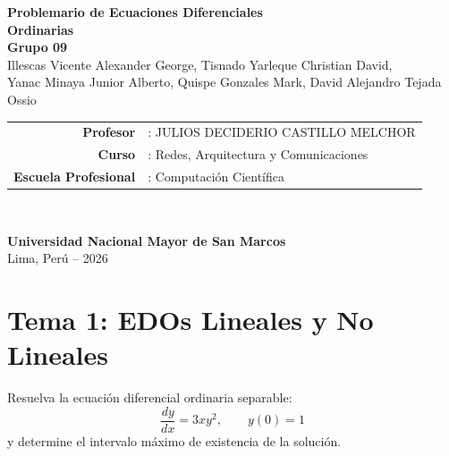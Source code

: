 \documentclass[11pt,a4paper]{article}
\begin{document}
\begin{titlepage}
\begin{center}
    \vspace*{2.0cm}
    
    {\fontsize{26}{32}\selectfont \textbf{Problemario de Ecuaciones Diferenciales}}\\[3mm]
    {\fontsize{26}{32}\selectfont \textbf{Ordinarias}}\\[8mm]
    {\LARGE \textbf{Grupo 09}}\\[2.0cm]
    
    {\normalsize Illescas Vicente Alexander George, \quad Tisnado Yarleque Christian David,}\\[2.5mm]
    {\normalsize Yanac Minaya Junior Alberto, \quad Quispe Gonzales Mark, \quad David Alejandro Tejada Ossio}\\[2.2cm]
    
    \renewcommand{\arraystretch}{1.35}
    \begin{tabular}{rl}
        \textbf{Profesor} & : JULIOS DECIDERIO CASTILLO MELCHOR \\
        \textbf{Curso} & : Redes, Arquitectura y Comunicaciones \\
        \textbf{Escuela Profesional} & : Computación Científica
    \end{tabular}\\[2.5cm]
    
    \vfill
    
    {\large \textbf{Universidad Nacional Mayor de San Marcos}}\\[2mm]
    {\normalsize Lima, Perú -- 2026}
    
    \vspace*{1.0cm}
\end{center}
\end{titlepage}

\section*{\color{unmsmblue} Tema 1: EDOs Lineales y No Lineales}

\begin{problema}[Problema 1.1]
Resuelva la ecuación diferencial ordinaria separable:
\[
\frac{dy}{dx} = 3x y^2, \qquad y(0) = 1
\]
y determine el intervalo máximo de existencia de la solución.
\end{problema}
\end{document}

